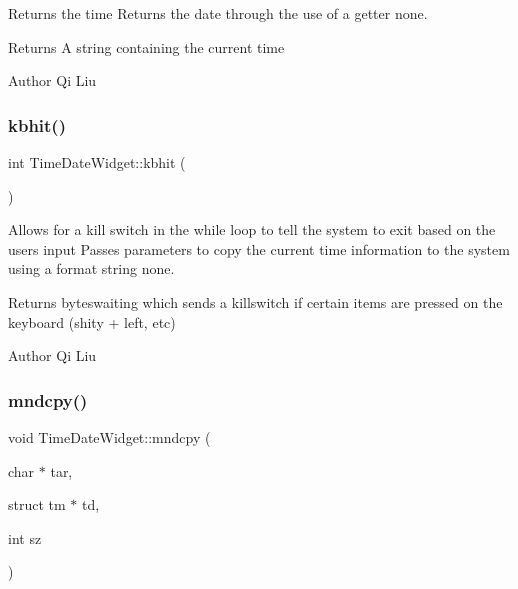 Returns the time  Returns the date through the use of a getter  none. 

\begin{DoxyReturn}{Returns}
A string containing the current time 
\end{DoxyReturn}
\begin{DoxyAuthor}{Author}
Qi Liu 
\end{DoxyAuthor}
\mbox{\label{class_time_date_widget_a52e79b18c5d46d77a0bc1a198ebcec40}} 
\subsubsection{\texorpdfstring{kbhit()}{kbhit()}}
{\footnotesize\ttfamily int Time\+Date\+Widget\+::kbhit (\begin{DoxyParamCaption}{ }\end{DoxyParamCaption})}



Allows for a kill switch in the while loop to tell the system to exit based on the user\textquotesingle{}s input  Passes parameters to copy the current time information to the system using a format string  none. 

\begin{DoxyReturn}{Returns}
byteswaiting which sends a killswitch if certain items are pressed on the keyboard (shity + left, etc) 
\end{DoxyReturn}
\begin{DoxyAuthor}{Author}
Qi Liu 
\end{DoxyAuthor}
\mbox{\label{class_time_date_widget_a437ad9c3d801f50692798ffffad08297}} 
\subsubsection{\texorpdfstring{mndcpy()}{mndcpy()}}
{\footnotesize\ttfamily void Time\+Date\+Widget\+::mndcpy (\begin{DoxyParamCaption}\item[{char $\ast$}]{tar,  }\item[{struct tm $\ast$}]{td,  }\item[{int}]{sz }\end{DoxyParamCaption})}



